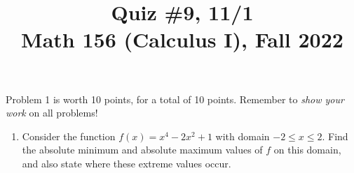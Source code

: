 \documentclass[11pt]{article}
\title{Quiz \#9, 11/1 \\ Math 156 (Calculus I), Fall 2022}
\date{}
\begin{document}
\maketitle

\thispagestyle{empty}

\vspace{-1cm}

Problem 1 is worth 10 points, for a total of 10 points. Remember to \emph{show your work} on all problems!

\begin{enumerate}
\item Consider the function $f(x) = x^4-2x^2+1$ with domain $-2 \leq x \leq 2$. Find the absolute minimum and absolute maximum values of $f$ on this domain, and also state where these extreme values occur.

\end{enumerate}
\end{document}
